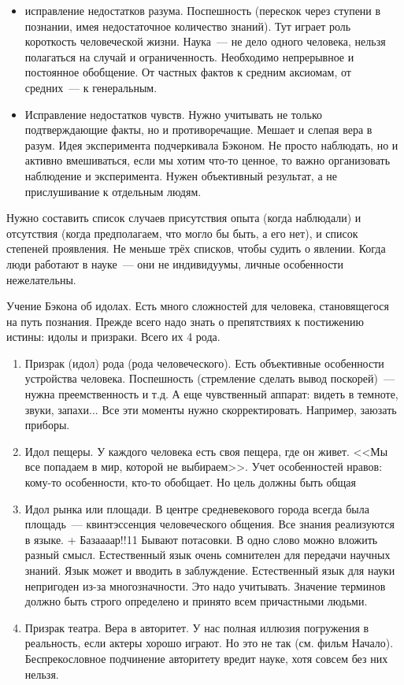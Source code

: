 \begin{itemize}
	\item исправление недостатков разума. Поспешность (перескок через ступени в познании, имея недостаточное количество знаний). Тут играет роль короткость человеческой жизни. Наука~--- не дело одного человека, нельзя полагаться на случай и ограниченность. Необходимо непрерывное и постоянное обобщение. От частных фактов к средним аксиомам, от средних~--- к генеральным.
	\item Исправление недостатков чувств. Нужно учитывать не только подтверждающие факты, но и противоречащие. Мешает и слепая вера в разум. Идея эксперимента подчеркивала Бэконом. Не просто наблюдать, но и активно вмешиваться, если мы хотим что-то ценное, то важно организовать наблюдение и эксперимента. Нужен объективный результат, а не прислушивание к отдельным людям.
\end{itemize}
Нужно составить список случаев присутствия опыта (когда наблюдали) и отсутствия (когда предполагаем, что могло бы быть, а его нет), и список степеней проявления. Не меньше трёх списков, чтобы судить о явлении. Когда люди работают в науке~--- они не индивидуумы, личные особенности нежелательны.

Учение Бэкона об идолах. Есть много сложностей для человека, становящегося на путь познания. Прежде всего надо знать о препятствиях к постижению истины: идолы и призраки. Всего их 4 рода.

\begin{enumerate}
	\item Призрак (идол) рода (рода человеческого). Есть объективные особенности устройства человека. Поспешность (стремление сделать вывод поскорей)~--- нужна преемственность и т.д. А еще чувственный аппарат: видеть в темноте, звуки, запахи... Все эти моменты нужно скорректировать. Например, заюзать приборы.
	\item Идол пещеры. У каждого человека есть своя пещера, где он живет. <<Мы все попадаем в мир, которой не выбираем>>. Учет особенностей нравов: кому-то особенности, кто-то обобщает. Но цель должны быть общая
	\item Идол рынка или площади. В центре средневекового города всегда была площадь~--- квинтэссенция человеческого общения. Все знания реализуются в языке. + Базаааар!!11 Бывают потасовки. В одно слово можно вложить разный смысл. Естественный язык очень сомнителен для передачи научных знаний. Язык может и вводить в заблуждение. Естественный язык для науки непригоден из-за многозначности. Это надо учитывать. Значение терминов должно быть строго определено и принято всем причастными людьми.
	\item Призрак театра. Вера в авторитет. У нас полная иллюзия погружения в реальность, если актеры хорошо играют. Но это не так (см. фильм Начало). Беспрекословное подчинение авторитету вредит науке, хотя совсем без них нельзя.
\end{enumerate}